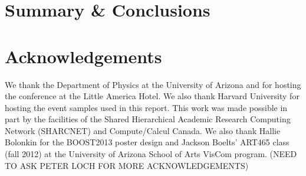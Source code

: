 \documentclass[twocolumn,epjc]{svjour3}
\begin{document}
%

\section{Summary \& Conclusions}
\label{sec:conclusions}

\section*{Acknowledgements}

We thank the Department of Physics at the University of Arizona and for hosting the conference at the Little America Hotel.  We also thank Harvard University for hosting the event samples used in this report.  This work was made possible in part by the facilities of the Shared Hierarchical Academic Research Computing Network (SHARCNET) and Compute/Calcul Canada.
We also thank Hallie Bolonkin for the BOOST2013 poster design and Jackson Boelts' ART465 class (fall 2012) at the University of Arizona School of Arts VisCom program. (NEED TO ASK PETER LOCH FOR MORE ACKNOWLEDGEMENTS)


%
%
\end{document}
